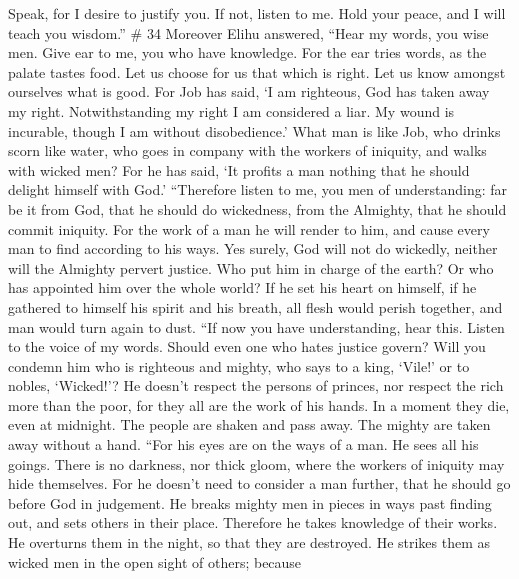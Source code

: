 Speak, for I desire to justify you.  If not, listen to me.
Hold your peace, and I will teach you wisdom.'' \# 34 
Moreover Elihu answered,  ``Hear my words, you wise men.
Give ear to me, you who have knowledge.  For the ear tries
words, as the palate tastes food.  Let us choose for us that
which is right. Let us know amongst ourselves what is good. 
For Job has said, `I am righteous, God has taken away my right.
 Notwithstanding my right I am considered a liar. My wound
is incurable, though I am without disobedience.'  What man
is like Job, who drinks scorn like water,  who goes in
company with the workers of iniquity, and walks with wicked men?
 For he has said, `It profits a man nothing that he should
delight himself with God.'  ``Therefore listen to me, you
men of understanding: far be it from God, that he should do wickedness,
from the Almighty, that he should commit iniquity.  For the
work of a man he will render to him, and cause every man to find
according to his ways.  Yes surely, God will not do
wickedly, neither will the Almighty pervert justice.  Who
put him in charge of the earth? Or who has appointed him over the whole
world?  If he set his heart on himself, if he gathered to
himself his spirit and his breath,  all flesh would perish
together, and man would turn again to dust.  ``If now you
have understanding, hear this. Listen to the voice of my words.
 Should even one who hates justice govern? Will you condemn
him who is righteous and mighty,  who says to a king,
`Vile!' or to nobles, `Wicked!'?  He doesn't respect the
persons of princes, nor respect the rich more than the poor, for they
all are the work of his hands.  In a moment they die, even
at midnight. The people are shaken and pass away. The mighty are taken
away without a hand.  ``For his eyes are on the ways of a
man. He sees all his goings.  There is no darkness, nor
thick gloom, where the workers of iniquity may hide themselves.
 For he doesn't need to consider a man further, that he
should go before God in judgement.  He breaks mighty men in
pieces in ways past finding out, and sets others in their place.
 Therefore he takes knowledge of their works. He overturns
them in the night, so that they are destroyed.  He strikes
them as wicked men in the open sight of others;  because
